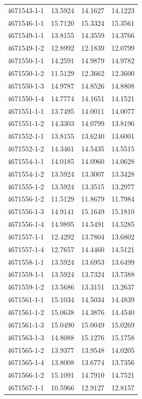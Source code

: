 \begin{longtable}{lrrr}
4671543-1-1 & 13.5924 & 14.1627 & 14.1223 \\
4671546-1-1 & 15.7120 & 15.3324 & 15.3561 \\
4671549-1-1 & 13.8155 & 14.3559 & 14.3766 \\
4671549-1-2 & 12.8992 & 12.1839 & 12.0799 \\
4671550-1-1 & 14.2591 & 14.9879 & 14.9782 \\
4671550-1-2 & 11.5129 & 12.3662 & 12.3600 \\
4671550-1-3 & 14.9787 & 14.8526 & 14.8808 \\
4671550-1-4 & 14.7774 & 14.1651 & 14.1521 \\
4671551-1-1 & 13.7495 & 14.0011 & 14.0077 \\
4671551-1-2 & 14.3303 & 14.0799 & 13.8196 \\
4671552-1-1 & 13.8155 & 13.6240 & 13.6001 \\
4671552-1-2 & 14.3461 & 14.5435 & 14.5515 \\
4671554-1-1 & 14.0185 & 14.0960 & 14.0628 \\
4671554-1-2 & 13.5924 & 13.3007 & 13.3428 \\
4671555-1-2 & 13.5924 & 13.3515 & 13.2977 \\
4671556-1-2 & 11.5129 & 11.8679 & 11.7984 \\
4671556-1-3 & 14.9141 & 15.1649 & 15.1810 \\
4671556-1-4 & 14.9895 & 14.5491 & 14.5285 \\
4671557-1-1 & 12.4292 & 13.7804 & 13.6802 \\
4671557-1-4 & 12.7657 & 14.4460 & 14.5121 \\
4671558-1-1 & 13.5924 & 13.6953 & 13.6499 \\
4671559-1-1 & 13.5924 & 13.7324 & 13.7388 \\
4671559-1-2 & 13.5686 & 13.3151 & 13.2637 \\
4671561-1-1 & 15.1034 & 14.5034 & 14.4839 \\
4671561-1-2 & 15.0638 & 14.3876 & 14.4540 \\
4671561-1-3 & 15.0490 & 15.0049 & 15.0269 \\
4671563-1-3 & 14.8088 & 15.1276 & 15.1758 \\
4671565-1-2 & 13.9377 & 13.9548 & 14.0205 \\
4671565-1-4 & 13.8008 & 13.6774 & 13.7356 \\
4671566-1-2 & 15.1091 & 14.7910 & 14.7521 \\
4671567-1-1 & 10.5966 & 12.9127 & 12.8157 \\

\end{longtable}
